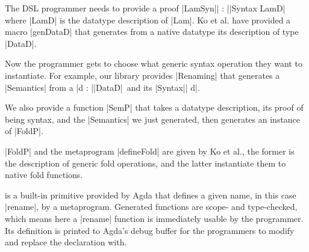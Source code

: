 \documentclass[sigplan,review,fleqn]{acmart}
\renewcommand{\verb}{\collectverb{\color{AgdaFunction}}}
\newcommand{\macro}{\collectverb{\color{AgdaMacro}}}
\newcommand{\name}{\collectverb{\it}}
\begin{document}
The DSL programmer needs to provide a proof \verb|LamSyn|\name| : |\verb|Syntax LamD| where \verb|LamD| is the datatype description of \verb|Lam|. 
Ko et al. have provided a macro \macro|genDataD| that generates from a native datatype its description of type \verb|DataD|.
\begin{code}
	\>[0]\AgdaSpace{}%
	\AgdaSymbol{=}\AgdaSpace{}%
	\AgdaSpace{}%
	\<%
\end{code}
Now the programmer gets to choose what generic syntax operation they want to instantiate.
For example, our library provides \verb|Renaming| that generates a \verb|Semantics| from a \name|d : |\verb|DataD|\ and its \verb|Syntax|\name| d|.
\begin{code}
	\>[0]\AgdaSpace{}%
	\AgdaSymbol{=}\AgdaSpace{}%
	\AgdaSpace{}%
	\AgdaSpace{}%
	\<%
\end{code}
We also provide a function \verb|SemP| that takes a datatype description, its proof of being syntax, and the \verb|Semantics| we just generated, then generates an instance of \verb|FoldP|.
\begin{code}
	\>[0]\AgdaSpace{}%
	\AgdaSymbol{=}\AgdaSpace{}%
	\AgdaSpace{}%
	\AgdaSpace{}%
	\AgdaSpace{}%
	\<%
\end{code}
\verb|FoldP| and the metaprogram \verb|defineFold| are given by Ko et al., the former is the description of generic fold operations, and the latter instantiate them to native fold functions.
\begin{code}
	\>[0]\AgdaSpace{}%
	\AgdaSpace{}%
	\AgdaSymbol{=}\AgdaSpace{}%
	\AgdaSpace{}%
	\AgdaSpace{}%
	\<%
\end{code}
 is a built-in primitive provided by Agda that defines a given name, in this case \verb|rename|, by a metaprogram.
Generated functions are scope- and type-checked, which means here a \verb|rename| function is immediately usable by the programmer.
Its definition is printed to Agda's debug buffer for the programmers to modify and replace the  declaration with.    
\end{document}

